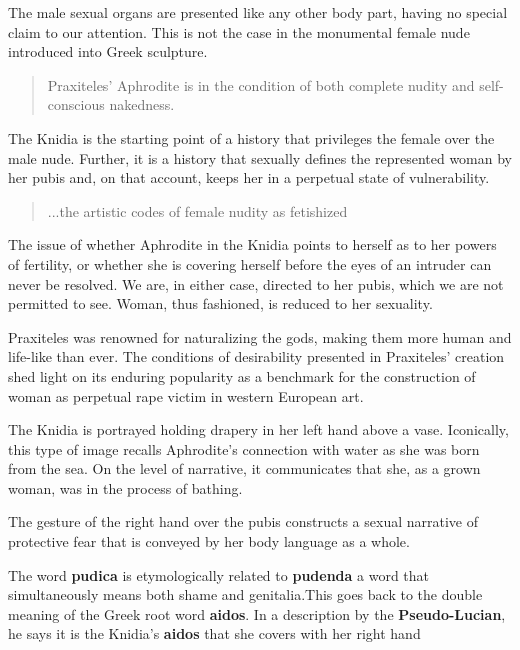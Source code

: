 The male sexual organs are presented like any other body part, having no special claim to our attention. This is not the case in the monumental female nude introduced into Greek sculpture.

\begin{quotation}
    Praxiteles' Aphrodite is in the condition of both complete nudity and self-conscious nakedness.
\end{quotation}

The Knidia is the starting point of a history that privileges the female over the male nude. Further, it is a history that sexually defines the represented woman by her pubis and, on that account, keeps her in a perpetual state of vulnerability.

\begin{quotation}
    ...the artistic codes of female nudity as fetishized
\end{quotation}

The issue of whether Aphrodite in the Knidia points to herself as to her powers of fertility, or whether she is covering herself before the eyes of an intruder can never be resolved. We are, in either case, directed to her pubis, which we are not permitted to see. Woman, thus fashioned, is reduced to her sexuality.

Praxiteles was renowned for naturalizing the gods, making them more human and life-like than ever. The conditions of desirability presented in Praxiteles' creation shed light on its enduring popularity as a benchmark for the construction of woman as perpetual rape victim in western European art. 

\begin{rmk}
    The Knidia is portrayed holding drapery in her left hand above a vase. Iconically, this type of image recalls Aphrodite's connection with water as she was born from the sea. On the level of narrative, it communicates that she, as a grown woman, was in the process of bathing.
\end{rmk}


The gesture of the right hand over the pubis constructs a sexual narrative of protective fear that is conveyed by her body language as a whole.

The word \textbf{pudica} is etymologically related to \textbf{pudenda} a word that simultaneously means both shame and genitalia.This goes back to the double meaning of the Greek root word \textbf{aidos}. In a description by the \textbf{Pseudo-Lucian}, he says it is the Knidia's \textbf{aidos} that she covers with her right hand

